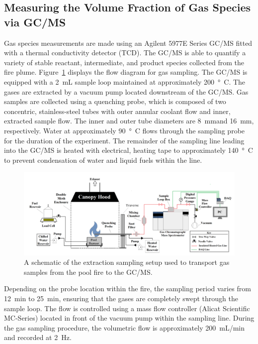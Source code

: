 \documentclass[12pt]{article}
\begin{document}
\subsection{Measuring the Volume Fraction of Gas Species via GC/MS}
\label{ssec:Gas_Species_Setup}

Gas species measurements are made using an Agilent 5977E Series GC/MS fitted with a thermal conductivity detector (TCD). The GC/MS is able to quantify a variety of stable reactant, intermediate, and product species collected from the fire plume. Figure~\ref{fig:Experimental_Setup} displays the flow diagram for gas sampling. The GC/MS is equipped with a 2~mL sample loop maintained at approximately \SI{200}{\degree C}. The gases are extracted by a vacuum pump located downstream of the GC/MS. Gas samples are collected using a quenching probe, which is composed of two concentric, stainless-steel tubes with outer annular coolant flow and inner, extracted sample flow. The inner and outer tube diameters are \SI{8}{mm}and \SI{16}{mm}, respectively. Water at approximately \SI{90}{\degree C} flows through the sampling probe for the duration of the experiment. The remainder of the sampling line leading into the GC/MS is heated with electrical, heating tape to approximately \SI{140}{\degree C} to prevent condensation of water and liquid fuels within the line.

\begin{figure}
	\centering
\includegraphics[width=\textwidth,keepaspectratio]{Experimental_Setup.png}
	\caption[A schematic of the gas sampling procedure]{A schematic of the extraction sampling setup used to transport gas samples from the pool fire to the GC/MS.}
	\label{fig:Experimental_Setup}
\end{figure}

Depending on the probe location within the fire, the sampling period varies from \SI{12}{min} to \SI{25}{min}, ensuring that the gases are completely swept through the sample loop. The flow is controlled using a mass flow controller (Alicat Scientific MC-Series) located in front of the vacuum pump within the sampling line. During the gas sampling procedure, the volumetric flow is approximately 200~mL/min and recorded at \SI{2}{\hertz}.
\end{document}
